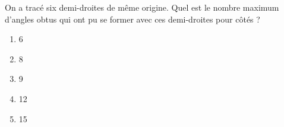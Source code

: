 On a tracé six demi-droites de même origine. Quel est le nombre maximum d'angles obtus qui ont pu se former avec ces demi-droites pour côtés ?
\begin{multicols}{5}
  \begin{enumerate}[A/]
  \item 6
  \item 8
  \item 9
  \item 12
  \item 15
  \end{enumerate}
\end{multicols}